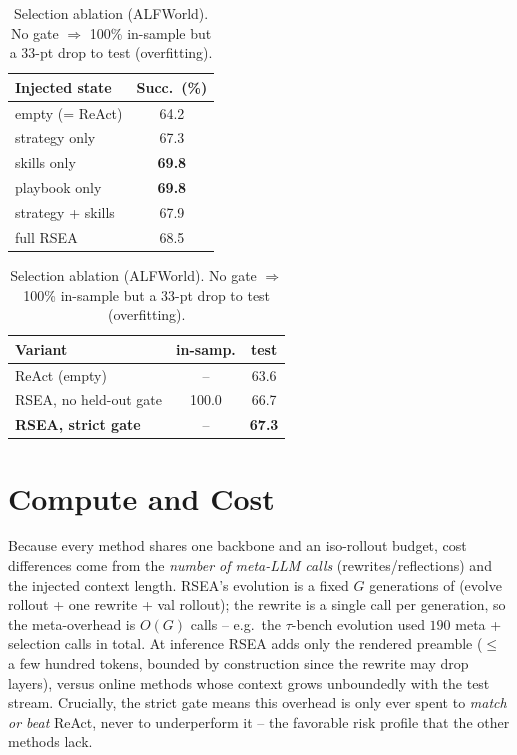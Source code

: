 \documentclass{article}
\begin{document}
\begin{table}[t]
  \centering
  \begin{minipage}{0.5\linewidth}\centering
  \caption{Layer ablation (ALFWorld test, 54$\times$3 seeds). Every subset beats
  ReAct; layers overlap.}
  \label{tab:abl_layers}
  \footnotesize
  \begin{tabular}{lc}
    \toprule
    \textbf{Injected state} & \textbf{Succ.\ (\%)} \\
    \midrule
    empty (= ReAct)        & 64.2 \\
    strategy only          & 67.3 \\
    skills only            & \textbf{69.8} \\
    playbook only          & \textbf{69.8} \\
    strategy + skills      & 67.9 \\
    full RSEA              & 68.5 \\
    \bottomrule
  \end{tabular}
  \end{minipage}\hfill
  \begin{minipage}{0.46\linewidth}\centering
  \caption{Selection ablation (ALFWorld). No gate $\Rightarrow$ 100\% in-sample but a
  33-pt drop to test (overfitting).}
  \label{tab:abl_val}
  \footnotesize
  \begin{tabular}{lcc}
    \toprule
    \textbf{Variant} & \textbf{in-samp.} & \textbf{test} \\
    \midrule
    ReAct (empty)             & --    & 63.6 \\
    RSEA, no held-out gate    & 100.0 & 66.7 \\
    \textbf{RSEA, strict gate} & --   & \textbf{67.3} \\
    \bottomrule
  \end{tabular}
  \end{minipage}
\end{table}

\section{Compute and Cost}
\label{sec:cost}
Because every method shares one backbone and an iso-rollout budget, cost differences
come from the \emph{number of meta-LLM calls} (rewrites/reflections) and the injected
context length. RSEA's evolution is a fixed $G$ generations of (evolve rollout +
one rewrite + val rollout); the rewrite is a single call per generation, so the
meta-overhead is $O(G)$ calls -- e.g.\ the $\tau$-bench evolution used $190$ meta +
selection calls in total. At inference RSEA adds only the rendered preamble
($\le$ a few hundred tokens, bounded by construction since the rewrite may drop
layers), versus online methods whose context grows unboundedly with the test stream.
Crucially, the strict gate means this overhead is only ever spent to \emph{match or
beat} ReAct, never to underperform it -- the favorable risk profile that the other
methods lack.
\end{document}
